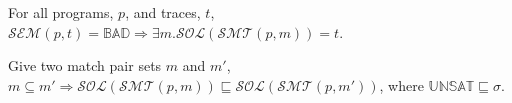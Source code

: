 \begin{theorem}[Completeness]
For all programs, $p$, and traces, $t$, $\mathcal{SEM}(p, t) =
\mathbb{BAD} \Rightarrow \exists m . \mathcal{SOL}(\mathcal{SMT}(p,
m)) = t$.
\end{theorem}

\begin{theorem}[Approximation]
Give two match pair sets $m$ and $m'$, $m \subseteq m' \Rightarrow \mathcal{SOL}(\mathcal{SMT}(p, m))
  \sqsubseteq \mathcal{SOL}(\mathcal{SMT}(p, m'))$, where
  $\mathbb{UNSAT} \sqsubseteq \sigma$.
\end{theorem}


 


